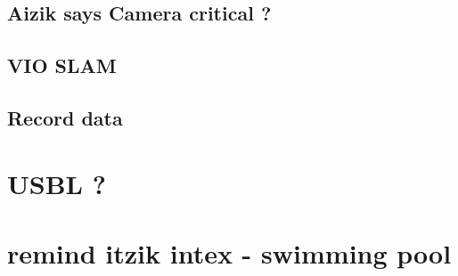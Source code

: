 \documentclass[11pt]{article}
\begin{document}
\subsection{Aizik says Camera critical ?}
\label{sec:orgaf5df48}
\subsection{VIO SLAM}
\label{sec:org306d7b9}
\subsection{Record data}
\label{sec:org115d6e1}
\section{USBL ?}
\label{sec:org923a33f}
\section{remind itzik intex - swimming pool}
\label{sec:org1fec2e1}
\end{document}
